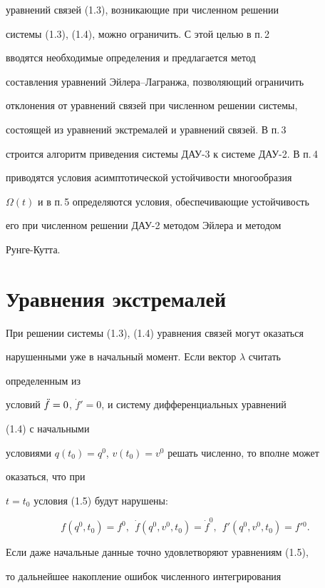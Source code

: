уравнений связей (1.3), возникающие при численном решении 


системы (1.3), (1.4), можно ограничить. С этой целью в п.\,2 


вводятся необходимые определения и предлагается метод 


составления уравнений Эйлера--Лагранжа, позволяющий ограничить 


отклонения от уравнений связей при численном решении системы, 


состоящей из уравнений экстремалей и уравнений связей. В п.\,3 


строится алгоритм приведения системы ДАУ-3 к системе ДАУ-2. В п.\,4 


приводятся условия асимптотической устойчивости многообразия 


$\Omega(t)$ и в п.\,5 определяются условия, обеспечивающие устойчивость 


его при численном решении ДАУ-2 методом Эйлера и методом 


Рун\-ге-Кут\-та. 


 


\section{Уравнения экстремалей} 


 


При решении системы (1.3), (1.4) уравнения связей могут оказаться 


нарушенными уже в начальный момент. Если вектор $\lambda$ считать 


определенным из 


условий $\Ddot f=0$, $\Dot f'=0$, и систему дифференциальных уравнений 


(1.4) с начальными 


условиями $q(t_0)=q^0$, $v(t_0)=v^0$ решать численно, то вполне может 


оказаться, что при 


$t=t_0$ условия (1.5) будут нарушены: 


$$ 


f(q^0,t_0)=f^0,\ \ \Dot f(q^0,v^0,t_0)=\Dot f^0, 


\ \ f'(q^0,v^0,t_0)=f'{}^0. 


$$ 


Если даже начальные данные точно удовлетворяют уравнениям (1.5), 


то дальнейшее накопление ошибок численного интегрирования 


